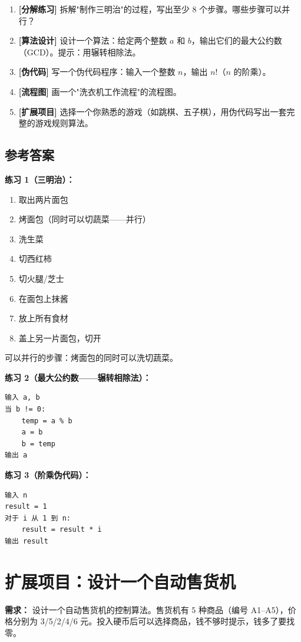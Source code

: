 \documentclass[a4paper,12pt]{ctexart}
\begin{document}
\begin{enumerate}
  \item \textbf{[分解练习]} 拆解"制作三明治"的过程，写出至少 8 个步骤。哪些步骤可以并行？
  \item \textbf{[算法设计]} 设计一个算法：给定两个整数 $a$ 和 $b$，输出它们的最大公约数（GCD）。提示：用辗转相除法。
  \item \textbf{[伪代码]} 写一个伪代码程序：输入一个整数 $n$，输出 $n!$（$n$ 的阶乘）。
  \item \textbf{[流程图]} 画一个"洗衣机工作流程"的流程图。
  \item \textbf{[扩展项目]} 选择一个你熟悉的游戏（如跳棋、五子棋），用伪代码写出一套完整的游戏规则算法。
\end{enumerate}

\subsection*{参考答案}

\textbf{练习 1（三明治）：}
\begin{enumerate}
  \item 取出两片面包
  \item 烤面包（同时可以切蔬菜——并行）
  \item 洗生菜
  \item 切西红柿
  \item 切火腿/芝士
  \item 在面包上抹酱
  \item 放上所有食材
  \item 盖上另一片面包，切开
\end{enumerate}
可以并行的步骤：烤面包的同时可以洗切蔬菜。

\textbf{练习 2（最大公约数——辗转相除法）：}
\begin{verbatim}
输入 a, b
当 b != 0:
    temp = a % b
    a = b
    b = temp
输出 a
\end{verbatim}

\textbf{练习 3（阶乘伪代码）：}
\begin{verbatim}
输入 n
result = 1
对于 i 从 1 到 n:
    result = result * i
输出 result
\end{verbatim}

\section*{扩展项目：设计一个自动售货机}

\textbf{需求：} 设计一个自动售货机的控制算法。售货机有 5 种商品（编号 A1--A5），价格分别为 3/5/2/4/6 元。投入硬币后可以选择商品，钱不够时提示，钱多了要找零。
\end{document}
